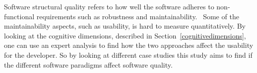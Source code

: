 Software structural quality refers to how well the software adheres to
non-functional requirements such as robustness and
maintainability.~\cite{Pressman:2004:SEP:994110} Some of the maintainability
aspects, such as usability, is hard to measure quantitatively. By looking at the
cognitive dimensions, described in Section~\ref{cognitivedimensions}, one can
use an expert analysis to find how the two approaches affect the usability for
the developer. So by looking at different case studies this study aims to find
if the different software paradigms affect software quality. 


